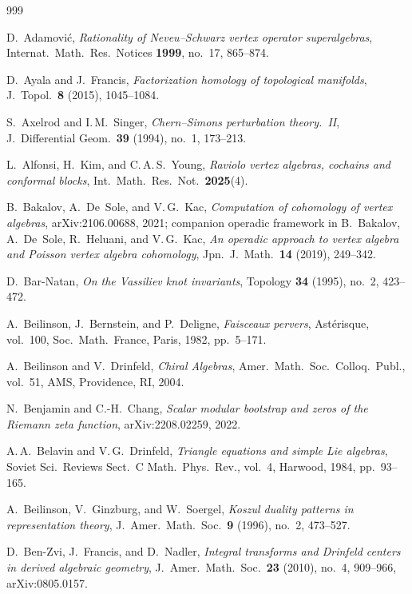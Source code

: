 \documentclass[11pt]{memoir}
\begin{document}
\begin{thebibliography}{999}

 D.~Adamovi\'c, \emph{Rationality of Neveu--Schwarz vertex operator superalgebras}, Internat.\ Math.\ Res.\ Notices \textbf{1999}, no.~17, 865--874.

 D.~Ayala and J.~Francis, \emph{Factorization homology of topological manifolds}, J.~Topol.\ \textbf{8} (2015), 1045--1084.

 S.~Axelrod and I.\,M.~Singer, \emph{Chern--Simons perturbation theory.~II}, J.~Differential Geom.\ \textbf{39} (1994), no.~1, 173--213.

 L.~Alfonsi, H.~Kim, and C.\,A.\,S.~Young, \emph{Raviolo vertex algebras, cochains and conformal blocks}, Int.\ Math.\ Res.\ Not.\ \textbf{2025}(4).

 B.~Bakalov, A.~De~Sole, and V.\,G.~Kac, \emph{Computation of cohomology of vertex algebras}, arXiv:2106.00688, 2021; companion operadic framework in B.~Bakalov, A.~De~Sole, R.~Heluani, and V.\,G.~Kac, \emph{An operadic approach to vertex algebra and Poisson vertex algebra cohomology}, Jpn.\ J.\ Math.\ \textbf{14} (2019), 249--342.

 D.~Bar-Natan, \emph{On the Vassiliev knot invariants}, Topology \textbf{34} (1995), no.~2, 423--472.

 A.~Beilinson, J.~Bernstein, and P.~Deligne, \emph{Faisceaux pervers}, Ast\'erisque, vol.~100, Soc.\ Math.\ France, Paris, 1982, pp.~5--171.

 A.~Beilinson and V.~Drinfeld, \emph{Chiral Algebras}, Amer.\ Math.\ Soc.\ Colloq.\ Publ., vol.~51, AMS, Providence, RI, 2004.

 N.~Benjamin and C.-H.~Chang, \emph{Scalar modular bootstrap and zeros of the Riemann zeta function}, arXiv:2208.02259, 2022.

 A.\,A.~Belavin and V.\,G.~Drinfeld, \emph{Triangle equations and simple Lie algebras}, Soviet Sci.\ Reviews Sect.~C Math.\ Phys.\ Rev., vol.~4, Harwood, 1984, pp.~93--165.

 A.~Beilinson, V.~Ginzburg, and W.~Soergel, \emph{Koszul duality patterns in representation theory}, J.~Amer.\ Math.\ Soc.\ \textbf{9} (1996), no.~2, 473--527.

 D.~Ben-Zvi, J.~Francis, and D.~Nadler, \emph{Integral transforms and Drinfeld centers in derived algebraic geometry}, J.~Amer.\ Math.\ Soc.\ \textbf{23} (2010), no.~4, 909--966, arXiv:0805.0157.


\end{thebibliography}
\end{document}
